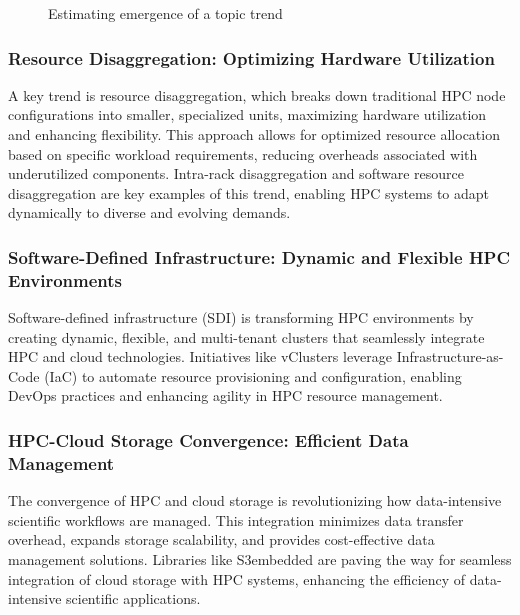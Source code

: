     \begin{figure}[H]
        \centering
        
        \caption{Estimating emergence of a topic trend}
        \label{fig:enter-label}
    \end{figure}



    \subsubsection{Resource Disaggregation: Optimizing Hardware Utilization}
    A key trend is resource disaggregation, which breaks down traditional HPC node configurations into smaller, specialized units, maximizing hardware utilization and enhancing flexibility. This approach allows for optimized resource allocation based on specific workload requirements, reducing overheads associated with underutilized components. Intra-rack disaggregation \cite{michelogiannakis_case_2022} and software resource disaggregation \cite{copik_software_2024} are key examples of this trend, enabling HPC systems to adapt dynamically to diverse and evolving demands.
    \subsubsection{Software-Defined Infrastructure: Dynamic and Flexible HPC Environments}
    Software-defined infrastructure (SDI) is transforming HPC environments by creating dynamic, flexible, and multi-tenant clusters that seamlessly integrate HPC and cloud technologies. Initiatives like vClusters \cite{alam_versatile_2023} leverage Infrastructure-as-Code (IaC) to automate resource provisioning and configuration, enabling DevOps practices and enhancing agility in HPC resource management.
    \subsubsection{HPC-Cloud Storage Convergence: Efficient Data Management}
    The convergence of HPC and cloud storage is revolutionizing how data-intensive scientific workflows are managed. This integration minimizes data transfer overhead, expands storage scalability, and provides cost-effective data management solutions. Libraries like S3embedded \cite{gadban_analyzing_2022} are paving the way for seamless integration of cloud storage with HPC systems, enhancing the efficiency of data-intensive scientific applications.
